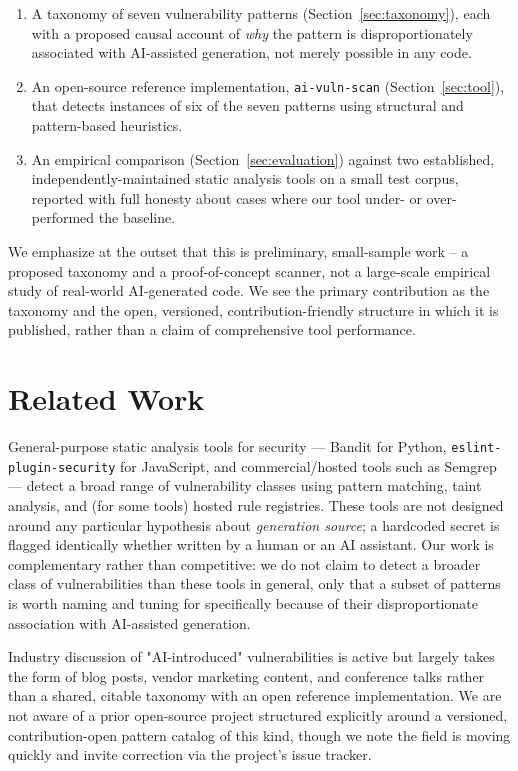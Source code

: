 \documentclass[11pt]{article}
\begin{document}
\begin{enumerate}
  \item A taxonomy of seven vulnerability patterns (Section~\ref{sec:taxonomy}), each
  with a proposed causal account of \emph{why} the pattern is
  disproportionately associated with AI-assisted generation, not merely
  possible in any code.
  \item An open-source reference implementation, \texttt{ai-vuln-scan}
  (Section~\ref{sec:tool}), that detects instances of six of the seven
  patterns using structural and pattern-based heuristics.
  \item An empirical comparison (Section~\ref{sec:evaluation}) against two
  established, independently-maintained static analysis tools on a small
  test corpus, reported with full honesty about cases where our tool
  under- or over-performed the baseline.
\end{enumerate}

We emphasize at the outset that this is preliminary, small-sample work --
a proposed taxonomy and a proof-of-concept scanner, not a large-scale
empirical study of real-world AI-generated code. We see the primary
contribution as the taxonomy and the open, versioned, contribution-friendly
structure in which it is published, rather than a claim of comprehensive
tool performance.

\section{Related Work}

General-purpose static analysis tools for security --- Bandit
\cite{bandit} for Python, \texttt{eslint-plugin-security}
\cite{eslintsecurity} for JavaScript, and commercial/hosted tools such as
Semgrep \cite{semgrep} --- detect a broad range of vulnerability classes
using pattern matching, taint analysis, and (for some tools) hosted rule
registries. These tools are not designed around any particular hypothesis
about \emph{generation source}; a hardcoded secret is flagged identically
whether written by a human or an AI assistant. Our work is
complementary rather than competitive: we do not claim to detect a broader
class of vulnerabilities than these tools in general, only that a subset of
patterns is worth naming and tuning for specifically because of their
disproportionate association with AI-assisted generation.

Industry discussion of "AI-introduced" vulnerabilities is active but
largely takes the form of blog posts, vendor marketing content, and
conference talks rather than a shared, citable taxonomy with an open
reference implementation. We are not aware of a prior open-source project
structured explicitly around a versioned, contribution-open pattern
catalog of this kind, though we note the field is moving quickly and
invite correction via the project's issue tracker.
\end{document}
